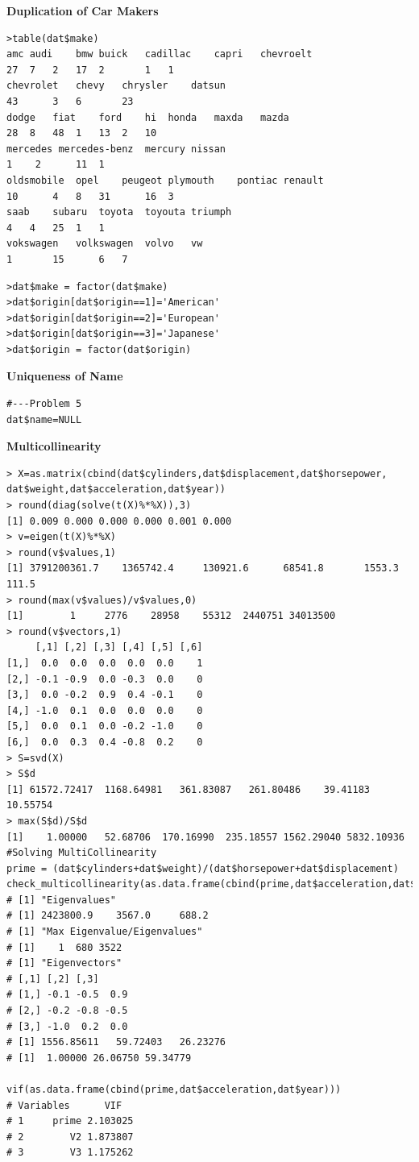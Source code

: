 \documentclass[11pt]{article} %
\begin{document}
\textbf{Duplication of Car Makers}
\begin{lstlisting}
>table(dat$make)
amc	audi	bmw	buick	cadillac	capri	chevroelt
27	7	2 	17	2 		1 	1 
chevrolet	chevy	chrysler	datsun 
43		3 	6 		23 
dodge	fiat	ford	hi	honda	maxda	mazda
28 	8	48 	1	13	2	10	
mercedes mercedes-benz	mercury	nissan 
1	 2		11	1 
oldsmobile	opel 	peugeot	plymouth	pontiac	renault
10		4	8	31		16	3
saab	subaru	toyota	toyouta	triumph
4	4	25	1	1 
vokswagen	volkswagen 	volvo	vw 
1		15		6	7 
\end{lstlisting}
\begin{lstlisting}
>dat$make = factor(dat$make)
>dat$origin[dat$origin==1]='American'
>dat$origin[dat$origin==2]='European'
>dat$origin[dat$origin==3]='Japanese'
>dat$origin = factor(dat$origin)
\end{lstlisting}
\textbf{Uniqueness of Name}
\begin{lstlisting}
#---Problem 5
dat$name=NULL
\end{lstlisting}
\textbf{Multicollinearity}
\begin{lstlisting}
> X=as.matrix(cbind(dat$cylinders,dat$displacement,dat$horsepower,
dat$weight,dat$acceleration,dat$year))
> round(diag(solve(t(X)%*%X)),3) 
[1] 0.009 0.000 0.000 0.000 0.001 0.000
> v=eigen(t(X)%*%X)
> round(v$values,1)
[1] 3791200361.7    1365742.4     130921.6      68541.8       1553.3        111.5
> round(max(v$values)/v$values,0)
[1]        1     2776    28958    55312  2440751 34013500
> round(v$vectors,1)
     [,1] [,2] [,3] [,4] [,5] [,6]
[1,]  0.0  0.0  0.0  0.0  0.0    1
[2,] -0.1 -0.9  0.0 -0.3  0.0    0
[3,]  0.0 -0.2  0.9  0.4 -0.1    0
[4,] -1.0  0.1  0.0  0.0  0.0    0
[5,]  0.0  0.1  0.0 -0.2 -1.0    0
[6,]  0.0  0.3  0.4 -0.8  0.2    0
> S=svd(X)
> S$d
[1] 61572.72417  1168.64981   361.83087   261.80486    39.41183    10.55754
> max(S$d)/S$d
[1]    1.00000   52.68706  170.16990  235.18557 1562.29040 5832.10936
#Solving MultiCollinearity
prime = (dat$cylinders+dat$weight)/(dat$horsepower+dat$displacement)
check_multicollinearity(as.data.frame(cbind(prime,dat$acceleration,dat$year)))
# [1] "Eigenvalues"
# [1] 2423800.9    3567.0     688.2
# [1] "Max Eigenvalue/Eigenvalues"
# [1]    1  680 3522
# [1] "Eigenvectors"
# [,1] [,2] [,3]
# [1,] -0.1 -0.5  0.9
# [2,] -0.2 -0.8 -0.5
# [3,] -1.0  0.2  0.0
# [1] 1556.85611   59.72403   26.23276
# [1]  1.00000 26.06750 59.34779

vif(as.data.frame(cbind(prime,dat$acceleration,dat$year)))
# Variables      VIF
# 1     prime 2.103025
# 2        V2 1.873807
# 3        V3 1.175262
\end{lstlisting}
\end{document}
